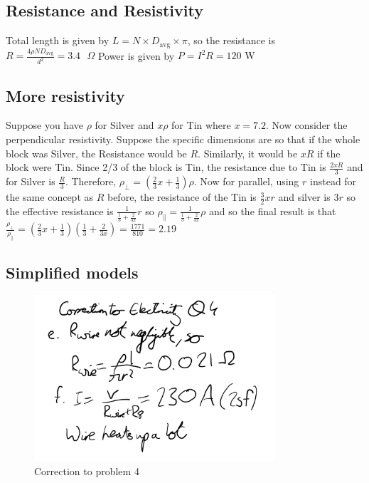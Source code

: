 \documentclass{article}
\begin{document}
\subsection{Resistance and Resistivity}
Total length is given by $L=N \times D_{\text{avg}} \times \pi$, so the resistance is $R=\frac{4\rho N D_{\text{avg}}}{ d^2}=3.4 \text{ }\Omega$
\newline
Power is given by $P=I^2 R = 120 \text{ W}$
\subsection{More resistivity}
Suppose you have $\rho$ for Silver and $x \rho$ for Tin where $x=7.2$. Now consider the perpendicular resistivity. Suppose the specific dimensions are so that if the whole block was Silver, the Resistance would be $R$. Similarly, it would be $xR$ if the block were Tin. Since 2/3 of the block is Tin, the resistance due to Tin is $\frac{2xR}{3}$ and for Silver is $\frac{R}{3}$. Therefore, $\rho_{\perp}=\left(\frac{2}{3}x + \frac{1}{3}\right)\rho$. Now for parallel, using $r$ instead for the same concept as $R$ before, the resistance of the Tin is $\frac{3}{2} xr$ and silver is $3r$ so the effective resistance is $\frac{1}{\frac{1}{3}+\frac{2}{3x}}r$ so $\rho_\parallel = \frac{1}{\frac{1}{3}+\frac{2}{3x}} \rho$ and so the final result is that $\frac{\rho_\perp}{\rho_\parallel}=(\frac{2}{3}x + \frac{1}{3})(\frac{1}{3}+\frac{2}{3x})=\frac{1771}{810}=2.19$
\subsection{Simplified models}
\begin{figure} [h]
    \centering
    \includegraphics[width=0.8\textwidth]{images/correction.png}
    \caption{Correction to problem 4}
\end{figure}
\end{document}
